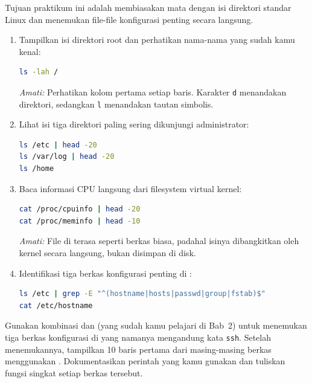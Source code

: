 Tujuan praktikum ini adalah membiasakan mata dengan isi direktori standar Linux dan
menemukan file-file konfigurasi penting secara langsung.

\begin{enumerate}
    \item Tampilkan isi direktori root dan perhatikan nama-nama yang sudah kamu kenal:
\begin{lstlisting}[language=bash, caption={Melihat isi root filesystem}]
ls -lah /
\end{lstlisting}
    \textit{Amati:} Perhatikan kolom pertama setiap baris. Karakter \texttt{d} menandakan direktori, sedangkan \texttt{l} menandakan tautan simbolis.

    \item Lihat isi tiga direktori paling sering dikunjungi administrator:
\begin{lstlisting}[language=bash, caption={Menginspeksi /etc, /var/log, dan /home}]
ls /etc | head -20
ls /var/log | head -20
ls /home
\end{lstlisting}

    \item Baca informasi CPU langsung dari filesystem virtual kernel:
\begin{lstlisting}[language=bash, caption={Membaca informasi sistem dari /proc}]
cat /proc/cpuinfo | head -20
cat /proc/meminfo | head -10
\end{lstlisting}
    \textit{Amati:} File di  terasa seperti berkas biasa, padahal isinya dibangkitkan oleh kernel secara langsung, bukan disimpan di disk.

    \item Identifikasi tiga berkas konfigurasi penting di :
\begin{lstlisting}[language=bash, caption={Mencari file konfigurasi penting dengan grep}]
ls /etc | grep -E "^(hostname|hosts|passwd|group|fstab)$"
cat /etc/hostname
\end{lstlisting}
\end{enumerate}

\begin{challengebox}
Gunakan kombinasi  dan  (yang sudah kamu pelajari di Bab~2) untuk menemukan
tiga berkas konfigurasi di  yang namanya mengandung kata \texttt{ssh}. Setelah
menemukannya, tampilkan 10 baris pertama dari masing-masing berkas menggunakan .
Dokumentasikan perintah yang kamu gunakan dan tuliskan fungsi singkat setiap berkas tersebut.
\end{challengebox}

